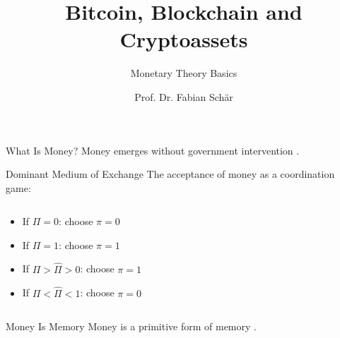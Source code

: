 \documentclass[]{beamer}
\title{Bitcoin, Blockchain and Cryptoassets}
\subtitle{Monetary Theory Basics}
\author{Prof. Dr. Fabian Schär}
\institute{University of Basel}
\begin{document}
\thispagestyle{empty}
\begin{frame}[noframenumbering]
	\titlepage
\end{frame}

\begin{frame}{What Is Money?}
	Money emerges without government intervention \cite{mengerOrigin1892}.
	\begin{figure}
		
	\end{figure}
\end{frame}

\begin{frame}{Dominant Medium of Exchange}
	The acceptance of money as a coordination game:
	\begin{columns}[T]
		\begin{column}{0.5\textwidth}
			\begin{footnotesize}
				\begin{itemize}
					\color{focus}
					\item<1-> If $\Pi = 0$: choose $\pi = 0$
					\item<2-> If $\Pi = 1$: choose $\pi = 1$
					\item<3-> If $\Pi > \hat\Pi > 0$: choose $\pi = 1$
					\item<3-> If $\Pi < \hat\Pi < 1$: choose $\pi = 0$
				\end{itemize}
			\end{footnotesize}
			\begin{figure}
				
			\end{figure}
		\end{column}
		\begin{column}{0.5\textwidth}
			\begin{figure}
				
			\end{figure}
		\end{column}
	\end{columns}
\end{frame}

\begin{frame}{Money Is Memory}
	Money is a primitive form of memory \cite{kocherlakotaMoney1998}.
		\begin{figure}
			
		\end{figure}
\end{frame}
\end{document}
